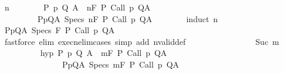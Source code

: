 \begin{isabellebody}
\ n\isanewline
\ \ \ \ \ \ \isamarkupfalse%
\ {\isachardoublequoteopen}{\isasymforall}{\isacharparenleft}P{\isacharcomma}\ p{\isacharcomma}\ Q{\isacharcomma}\ A{\isacharparenright}{\isasymin}{\isasymTheta}{\isachardot}\ {\isasymGamma}\ {\isasymTurnstile}n{\isacharcolon}\isactrlbsub {\isacharslash}F\isactrlesub \ P\ {\isacharparenleft}Call\ p{\isacharparenright}\ Q{\isacharcomma}A\isanewline
\ \ \ \ \ \ \ \ {\isasymLongrightarrow}\ {\isasymforall}{\isacharparenleft}P{\isacharcomma}p{\isacharcomma}Q{\isacharcomma}A{\isacharparenright}\ {\isasymin}Specs{\isachardot}\ {\isasymGamma}{\isasymTurnstile}n{\isacharcolon}\isactrlbsub {\isacharslash}F\isactrlesub \ P\ {\isacharparenleft}Call\ p{\isacharparenright}\ Q{\isacharcomma}A{\isachardoublequoteclose}\isanewline
\ \ \ \ \ \ \isamarkupfalse%
\ {\isacharparenleft}induct\ n{\isacharparenright}\isanewline
\ \ \ \ \ \ \ \ \isamarkupfalse%
\ {}\isanewline
\ \ \ \ \ \ \ \ \isamarkupfalse%
\ {\isachardoublequoteopen}{\isasymforall}{\isacharparenleft}P{\isacharcomma}p{\isacharcomma}Q{\isacharcomma}A{\isacharparenright}\ {\isasymin}Specs{\isachardot}\ {\isasymGamma}{\isasymTurnstile}{}{\isacharcolon}\isactrlbsub {\isacharslash}F\isactrlesub \ P\ {\isacharparenleft}Call\ p{\isacharparenright}\ Q{\isacharcomma}A{\isachardoublequoteclose}\isanewline
\ \ \ \ \ \ \ \ \ \ \isamarkupfalse%
\ {\isacharparenleft}fastforce\ elim{\isacharbang}{\isacharcolon}\ execn{\isacharunderscore}elim{\isacharunderscore}cases\ simp\ add{\isacharcolon}\ nvalid{\isacharunderscore}def{\isacharparenright}\isanewline
\ \ \ \ \ \ \isamarkupfalse%
\isanewline
\ \ \ \ \ \ \ \ \isamarkupfalse%
\ {\isacharparenleft}Suc\ m{\isacharparenright}\isanewline
\ \ \ \ \ \ \ \ \isamarkupfalse%
\ hyp{\isacharcolon}\ {\isachardoublequoteopen}{\isasymforall}{\isacharparenleft}P{\isacharcomma}\ p{\isacharcomma}\ Q{\isacharcomma}\ A{\isacharparenright}{\isasymin}{\isasymTheta}{\isachardot}\ {\isasymGamma}\ {\isasymTurnstile}m{\isacharcolon}\isactrlbsub {\isacharslash}F\isactrlesub \ P\ {\isacharparenleft}Call\ p{\isacharparenright}\ Q{\isacharcomma}A\isanewline
\ \ \ \ \ \ \ \ \ \ \ \ \ \ {\isasymLongrightarrow}\ {\isasymforall}{\isacharparenleft}P{\isacharcomma}p{\isacharcomma}Q{\isacharcomma}A{\isacharparenright}\ {\isasymin}Specs{\isachardot}\ {\isasymGamma}{\isasymTurnstile}m{\isacharcolon}\isactrlbsub {\isacharslash}F\isactrlesub \ P\ {\isacharparenleft}Call\ p{\isacharparenright}\ Q{\isacharcomma}A{\isachardoublequoteclose}\ \isamarkupfalse%

\end{isabellebody}

